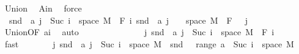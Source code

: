 \begin{isabellebody}
\ Union{\isacharparenleft}{\kern0pt}{}{\isacharparenright}{\kern0pt}\ \isamarkupfalse%
\ A{\isacharunderscore}{\kern0pt}in\ \isamarkupfalse%
\ force\ \isanewline
\ \ \isamarkupfalse%
\ {\isacharasterisk}{\kern0pt}{\isacharcolon}{\kern0pt}\ {\isachardoublequoteopen}snd\ {\isacharbackquote}{\kern0pt}\ {\isacharparenleft}{\kern0pt}a\ j\ {\isasyminter}\ {\isacharparenleft}{\kern0pt}{\isacharbraceleft}{\kern0pt}Suc\ i{\isacharbraceright}{\kern0pt}\ {\isasymtimes}\ space\ M{\isacharparenright}{\kern0pt}{\isacharparenright}{\kern0pt}\ {\isasymin}\ F\ i{\isachardoublequoteclose}\ {\isachardoublequoteopen}snd\ {\isacharbackquote}{\kern0pt}\ {\isacharparenleft}{\kern0pt}a\ j\ {\isasyminter}\ {\isacharparenleft}{\kern0pt}{\isacharbraceleft}{\kern0pt}{}{\isacharbraceright}{\kern0pt}\ {\isasymtimes}\ space\ M{\isacharparenright}{\kern0pt}{\isacharparenright}{\kern0pt}\ {\isasymin}\ F\ {}{\isachardoublequoteclose}\ \ j\ \isamarkupfalse%
\ Union{\isacharparenleft}{\kern0pt}{}{\isacharcomma}{\kern0pt}{}{\isacharparenright}{\kern0pt}{\isacharbrackleft}{\kern0pt}OF\ a{\isacharunderscore}{\kern0pt}i{\isacharbrackright}{\kern0pt}\ \isamarkupfalse%
\ auto\isanewline
\ \ \isacommand{{\isacharbraceleft}{\kern0pt}}\isamarkupfalse%
\isanewline
\ \ \ \ \isamarkupfalse%
\ {}\isanewline
\ \ \ \ \isamarkupfalse%
\ {\isachardoublequoteopen}{\isacharparenleft}{\kern0pt}{\isasymUnion}j{\isachardot}{\kern0pt}\ snd\ {\isacharbackquote}{\kern0pt}\ {\isacharparenleft}{\kern0pt}a\ j\ {\isasyminter}\ {\isacharparenleft}{\kern0pt}{\isacharbraceleft}{\kern0pt}Suc\ i{\isacharbraceright}{\kern0pt}\ {\isasymtimes}\ space\ M{\isacharparenright}{\kern0pt}{\isacharparenright}{\kern0pt}{\isacharparenright}{\kern0pt}\ {\isasymin}\ F\ i{\isachardoublequoteclose}\ \isamarkupfalse%
\ {\isacharasterisk}{\kern0pt}\ \isamarkupfalse%
\ fast\isanewline
\ \ \ \ \isamarkupfalse%
\ \isamarkupfalse%
\ {\isachardoublequoteopen}{\isacharparenleft}{\kern0pt}{\isasymUnion}j{\isachardot}{\kern0pt}\ snd\ {\isacharbackquote}{\kern0pt}\ {\isacharparenleft}{\kern0pt}a\ j\ {\isasyminter}\ {\isacharparenleft}{\kern0pt}{\isacharbraceleft}{\kern0pt}Suc\ i{\isacharbraceright}{\kern0pt}\ {\isasymtimes}\ space\ M{\isacharparenright}{\kern0pt}{\isacharparenright}{\kern0pt}{\isacharparenright}{\kern0pt}\ {\isacharequal}{\kern0pt}\ snd\ {\isacharbackquote}{\kern0pt}\ {\isacharparenleft}{\kern0pt}{\isasymUnion}\ {\isacharparenleft}{\kern0pt}range\ a{\isacharparenright}{\kern0pt}\ {\isasyminter}\ {\isacharparenleft}{\kern0pt}{\isacharbraceleft}{\kern0pt}Suc\ i{\isacharbraceright}{\kern0pt}\ {\isasymtimes}\ space\ M{\isacharparenright}{\kern0pt}{\isacharparenright}{\kern0pt}{\isachardoublequoteclose}\ \isamarkupfalse%

\end{isabellebody}
